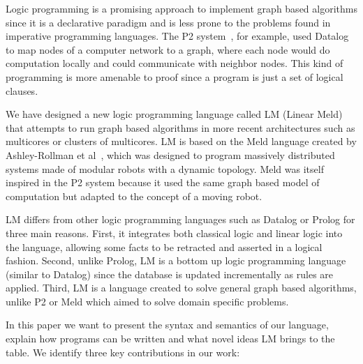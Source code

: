 Logic programming is a promising approach to implement graph based algorithms since it is a declarative paradigm
and is less prone to the problems found in imperative programming languages.
The P2 system~\cite{Loo-condie-garofalakis-p2}, for example, used Datalog to map nodes of a computer network
to a graph, where each node would do computation locally and could communicate with neighbor nodes.
This kind of programming is more amenable to proof since a program is just a set of logical clauses.

We have designed a new logic programming language called LM (Linear Meld) that attempts to run graph based
algorithms in more recent architectures such as multicores or clusters of multicores. LM is based on the Meld language created by
Ashley-Rollman et al~\cite{ashley-rollman-derosa-iros07wksp,ashley-rollman-iclp09}, which was designed to
program massively distributed systems made of modular robots with a dynamic topology. Meld was itself inspired
in the P2 system because it used the same graph based model of computation but adapted to the concept of a moving
robot.

LM differs from other logic programming languages such as Datalog or Prolog for three main reasons. First, it integrates both classical
logic and linear logic into the language, allowing some facts to be retracted and asserted in a logical fashion. Second, unlike
Prolog, LM is a bottom up logic programming language (similar to Datalog) since the database is updated incrementally as rules are
applied. Third, LM is a language created to solve general graph based algorithms, unlike P2 or Meld which aimed to solve domain
specific problems.

In this paper we want to present the syntax and semantics of our language, explain how programs can be written
and what novel ideas LM brings to the table. We identify three key contributions in our work:

